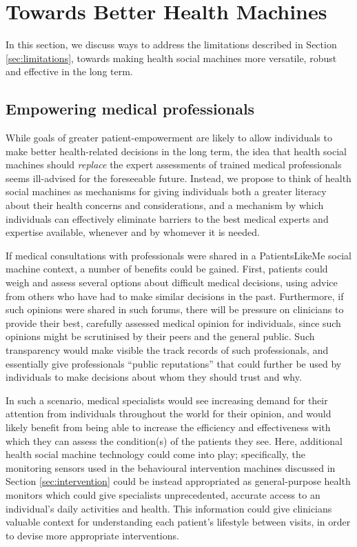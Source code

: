 \documentclass{www13-companion-accepted}
\begin{document}
\section{Towards Better Health Machines}

In this section, we discuss ways to address the limitations described
in Section \ref{sec:limitations}, towards making health social
machines more versatile, robust and effective in the long term.

\subsection{Empowering medical professionals}

While goals of greater patient-empowerment are likely to allow
individuals to make better health-related decisions in the long term,
the idea that health social machines should \emph{replace} the expert
assessments of trained medical professionals seems ill-advised for the
foreseeable future. Instead, we propose to think of health social
machines as mechanisms for giving individuals both a greater literacy
about their health concerns and considerations, and a mechanism by
which individuals can effectively eliminate barriers to the best
medical experts and expertise available, whenever and by whomever it
is needed.

If medical consultations with professionals were shared in a
PatientsLikeMe social machine context, a number of benefits could be
gained.  First, patients could weigh and assess several options about
difficult medical decisions, using advice from others who have had to
make similar decisions in the past.  Furthermore, if such opinions
were shared in such forums, there will be pressure on clinicians to
provide their best, carefully assessed medical opinion for
individuals, since such opinions might be scrutinised by their peers
and the general public.  Such transparency would make visible the
track records of such professionals, and essentially give
professionals ``public reputations'' that could further be used by
individuals to make decisions about whom they should trust and why.

In such a scenario, medical specialists would see increasing demand
for their attention from individuals throughout the world for their
opinion, and would likely benefit from being able to increase the
efficiency and effectiveness with which they can assess the
condition(s) of the patients they see.  Here, additional health social
machine technology could come into play; specifically, the monitoring
sensors used in the behavioural intervention machines discussed in
Section \ref{sec:intervention} could be instead appropriated as
general-purpose health monitors which could give specialists
unprecedented, accurate access to an individual's daily activities and
health.  This information could give clinicians valuable context for
understanding each patient's lifestyle between visits, in order to
devise more appropriate interventions.
\end{document}

